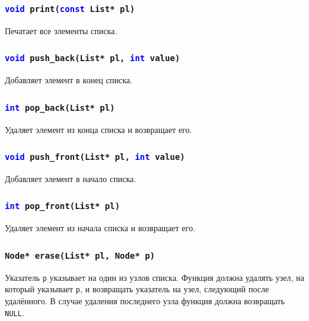 \documentclass[10pt]{article}
\begin{document}
\subsubsection{\texttt{\textcolor{blue}{void} print(\textcolor{blue}{const} List* pl)}}
Печатает все элементы списка.

\subsubsection{\texttt{\textcolor{blue}{void} push\_back(List* pl, \textcolor{blue}{int} value)}}
Добавляет элемент в конец списка.

\subsubsection{\texttt{\textcolor{blue}{int} pop\_back(List* pl)}}
Удаляет элемент из конца списка и возвращает его.

\subsubsection{\texttt{\textcolor{blue}{void} push\_front(List* pl, \textcolor{blue}{int} value)}}
Добавляет элемент в начало списка.

\subsubsection{\texttt{\textcolor{blue}{int} pop\_front(List* pl)}}
Удаляет элемент из начала списка и возвращает его.

\subsubsection{\texttt{Node* erase(List* pl, Node* p)}}
Указатель \texttt{p} указывает на один из узлов списка.
Функция должна удалять узел, на который указывает \texttt{p}, и возвращать указатель на узел, следующий после удалённого. В случае удаления последнего узла функция должна возвращать \texttt{NULL}.
\end{document}
